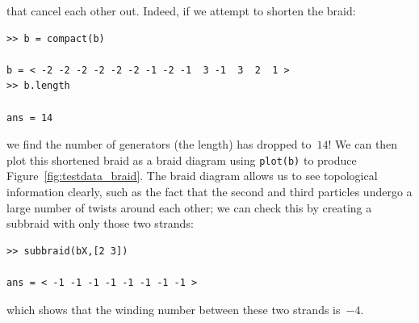 \documentclass[12pt]{article}
\begin{document}
that cancel each other out.  Indeed, if we attempt to shorten the
braid:
\begin{lstlisting}[frame=single,framerule=0pt]
>> b = compact(b)

b = < -2 -2 -2 -2 -2 -2 -1 -2 -1  3 -1  3  2  1 >
>> b.length

ans = 14
\end{lstlisting}
we find the number of generators (the length) has dropped to~$14$!  We
can then plot this shortened braid as a braid diagram using
\lstinline{plot(b)} to produce Figure~\ref{fig:testdata_braid}.  The
braid diagram allows us to see topological information clearly, such
as the fact that the second and third particles undergo a large number
of twists around each other; we can check this by creating a subbraid
with only those two strands:
\begin{lstlisting}[frame=single,framerule=0pt]
>> subbraid(bX,[2 3])

ans = < -1 -1 -1 -1 -1 -1 -1 -1 >
\end{lstlisting}
which shows that the winding number between these two strands is~$-4$.
\end{document}
